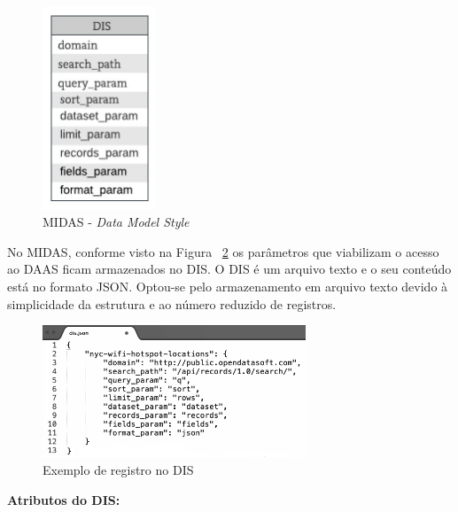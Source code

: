 \documentclass[11pt,a4paper]{article}
\begin{document}
\begin{figure} [h!]
  \centering
    \includegraphics[width=0.3\textwidth]{MIDAS_-_Estilo_Modelo_Dados}
  \caption{MIDAS - \textit{Data Model Style}}
  \label{modelo}
\end{figure}

No MIDAS, conforme visto na Figura ~\ref{registro} os parâmetros que viabilizam o acesso ao DAAS ficam armazenados no DIS. O DIS é um arquivo texto e o seu conteúdo está no formato JSON. Optou-se pelo armazenamento em arquivo texto devido à simplicidade da estrutura e ao número reduzido de registros. 


\begin{figure} [h!]
  \centering
    \includegraphics[width=0.7\textwidth]{DIS-exemplo}
  \caption{Exemplo de registro no DIS}
  \label{registro}
\end{figure}


\textbf{Atributos do DIS:}
\end{document}
